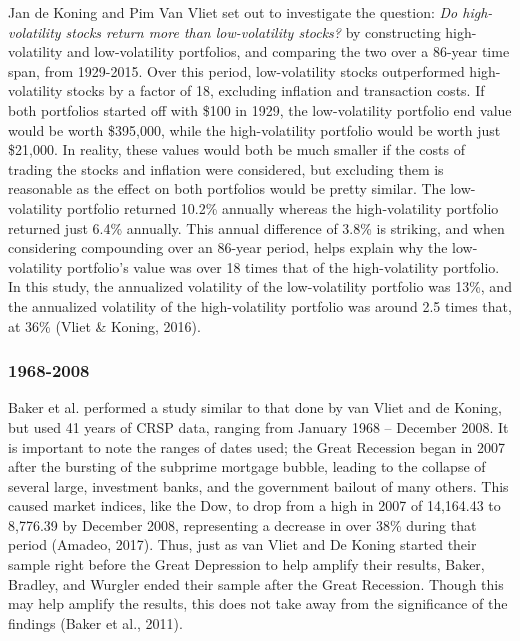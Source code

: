 \documentclass[12pt,twoside]{reedthesis}
\theoremstyle{definition}
\theoremstyle{definition}
\theoremstyle{definition}
\theoremstyle{remark}
\begin{document}
Jan de Koning and Pim Van Vliet set out to investigate the question:
\emph{Do high-volatility stocks return more than low-volatility stocks?}
by constructing high-volatility and low-volatility portfolios, and
comparing the two over a 86-year time span, from 1929-2015. Over this
period, low-volatility stocks outperformed high-volatility stocks by a
factor of 18, excluding inflation and transaction costs. If both
portfolios started off with \$100 in 1929, the low-volatility portfolio
end value would be worth \$395,000, while the high-volatility portfolio
would be worth just \$21,000. In reality, these values would both be
much smaller if the costs of trading the stocks and inflation were
considered, but excluding them is reasonable as the effect on both
portfolios would be pretty similar. The low-volatility portfolio
returned 10.2\% annually whereas the high-volatility portfolio returned
just 6.4\% annually. This annual difference of 3.8\% is striking, and
when considering compounding over an 86-year period, helps explain why
the low-volatility portfolio's value was over 18 times that of the
high-volatility portfolio. In this study, the annualized volatility of
the low-volatility portfolio was 13\%, and the annualized volatility of
the high-volatility portfolio was around 2.5 times that, at 36\% (Vliet
\& Koning, 2016).

\subsubsection{1968-2008}\label{section-1}

Baker et al. performed a study similar to that done by van Vliet and de
Koning, but used 41 years of CRSP data, ranging from January 1968 --
December 2008. It is important to note the ranges of dates used; the
Great Recession began in 2007 after the bursting of the subprime
mortgage bubble, leading to the collapse of several large, investment
banks, and the government bailout of many others. This caused market
indices, like the Dow, to drop from a high in 2007 of 14,164.43 to
8,776.39 by December 2008, representing a decrease in over 38\% during
that period (Amadeo, 2017). Thus, just as van Vliet and De Koning
started their sample right before the Great Depression to help amplify
their results, Baker, Bradley, and Wurgler ended their sample after the
Great Recession. Though this may help amplify the results, this does not
take away from the significance of the findings (Baker et al., 2011).
\end{document}
